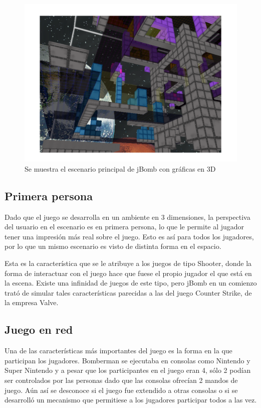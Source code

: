 \documentclass[a4paper,12pt,openany,oneside]{book}
\begin{document}
\begin{figure}
\begin{center}
\includegraphics[scale=.7]{tri.pdf}
\end{center}
\caption[Imágen de escenario 3D en jBomb]{Se muestra el escenario principal de jBomb con gráficas en 3D}
\label{trilabel}
\end{figure}
\subsection{Primera persona}
Dado que el juego se desarrolla en un ambiente en 3 dimensiones, la perspectiva del usuario en el escenario es en primera persona, lo que le permite al jugador tener una impresión más real sobre el juego. Esto es así para todos los jugadores, por lo que un mismo escenario es visto de distinta forma en el espacio.

Esta es la característica que se le atribuye a los juegos de tipo Shooter, donde la forma de interactuar con el juego hace que fuese el propio jugador el que está en la escena. Existe una infinidad de juegos de este tipo, pero jBomb en un comienzo trató de simular tales características parecidas a las del juego Counter Strike, de la empresa Valve.
\subsection{Juego en red}
Una de las características más importantes del juego es la forma en la que participan los jugadores. Bomberman se ejecutaba en consolas como Nintendo y Super Nintendo y a pesar que los participantes en el juego eran 4, sólo 2 podían ser controlados por las personas dado que las consolas ofrecían 2 mandos de juego. Aún así se desconoce si el juego fue extendido a otras consolas o si se desarrolló un mecanismo que permitiese a los jugadores participar todos a las vez.
\end{document}
